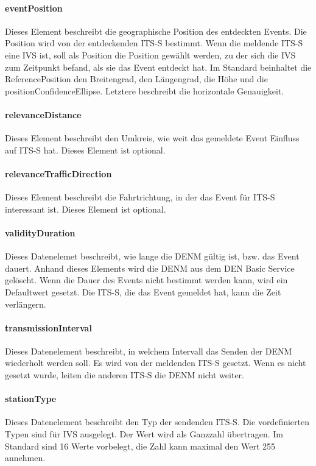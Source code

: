 \paragraph{eventPosition}
Dieses Element beschreibt die geographische Position des entdeckten Events. Die Position wird von der entdeckenden \ac{ITS-S} bestimmt. Wenn die meldende \ac{ITS-S} eine \ac{IVS} ist, soll als Position die Position gewählt werden, zu der sich die \ac{IVS} zum Zeitpunkt befand, als sie das Event entdeckt hat. Im Standard \cite{ts102894-2} beinhaltet die ReferencePosition den Breitengrad, den Längengrad, die Höhe und die positionConfidenceEllipse. Letztere beschreibt die horizontale Genauigkeit.


\paragraph{relevanceDistance}
Dieses Element beschreibt den Umkreis, wie weit das gemeldete Event Einfluss auf \ac{ITS-S} hat. Dieses Element ist optional. 

\paragraph{relevanceTrafficDirection}
Dieses Element beschreibt die Fahrtrichtung, in der das Event für \ac{ITS-S} interessant ist. Dieses Element ist optional. 

\paragraph{validityDuration}
Dieses Datenelemet   beschreibt, wie lange die \ac{DENM} gültig ist, bzw. das Event dauert. Anhand dieses Elements wird die \ac{DENM} aus dem \ac{DEN} Basic Service gelöscht. Wenn die Dauer des Events nicht bestimmt werden kann, wird ein Defaultwert gesetzt. Die \ac{ITS-S}, die das Event gemeldet hat, kann die Zeit verlängern.  

\paragraph{transmissionInterval}
Dieses Datenelement beschreibt, in welchem Intervall das Senden der \ac{DENM}  wiederholt werden soll. Es wird von der meldenden \ac{ITS-S} gesetzt. Wenn es nicht gesetzt wurde, leiten die anderen \ac{ITS-S} die \ac{DENM} nicht weiter. 

\paragraph{stationType}
Dieses Datenelement beschreibt den Typ der sendenden \ac{ITS-S}. Die vordefinierten Typen sind für \ac{IVS} ausgelegt. Der Wert wird als Ganzzahl übertragen. Im Standard \cite{ts102894-2} sind  16 Werte vorbelegt, die Zahl kann maximal den Wert 255 annehmen.



